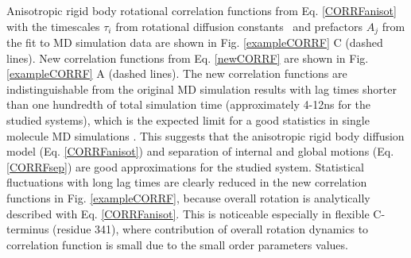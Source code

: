 \documentclass[pre,aps,floatfix,authordate1-4,twocolumn]{revtex4-1}
\begin{document}
Anisotropic rigid body rotational correlation functions
from Eq. \ref{CORRFanisot} with the timescales $\tau_i$
from rotational diffusion constants~\cite{Note1} and
prefactors $A_j$ from the fit to MD simulation data are
shown in Fig. \ref{exampleCORRF} C (dashed lines). New correlation functions
from Eq. \ref{newCORRF} are shown in Fig. \ref{exampleCORRF} A
(dashed lines). The new correlation functions are indistinguishable
from the original MD simulation results with lag times shorter than one
hundredth of total simulation time (approximately 4-12ns for the studied systems),
which is the expected limit for a good statistics in single molecule MD simulations \cite{lu06}.
This suggests that the anisotropic rigid body diffusion model (Eq. \ref{CORRFanisot}) and
separation of internal and global motions (Eq. \ref{CORRFsep}) are
good approximations for the studied system. Statistical fluctuations with long lag times
are clearly reduced in the new correlation functions in Fig. \ref{exampleCORRF}, because overall
rotation is analytically described with Eq. \ref{CORRFanisot}.
This is noticeable especially in flexible C-terminus (residue 341),
where contribution of overall rotation dynamics to correlation function
is small due to the small order parameters values.


\end{document}
